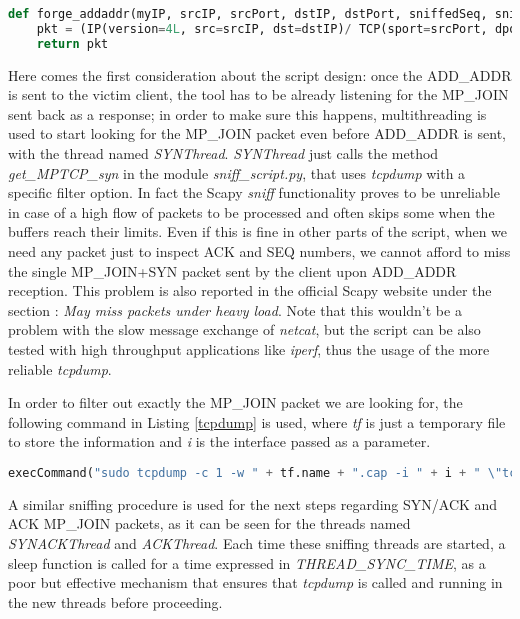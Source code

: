\begin{lstlisting}[language=python, caption=\textit{forge\_addaddr method}, label=forgeaddaddrfunction] 
def forge_addaddr(myIP, srcIP, srcPort, dstIP, dstPort, sniffedSeq, sniffedAck):
    pkt = (IP(version=4L, src=srcIP, dst=dstIP)/ TCP(sport=srcPort, dport=dstPort, flags="A", seq=sniffedSeq, ack=sniffedAck, options=[TCPOption_MP(mptcp=MPTCP_AddAddr(address_id=ADDRESS_ID, adv_addr=myIP))]))
    return pkt
\end{lstlisting}

Here comes the first consideration about the script design: once the ADD\_ADDR is sent to the victim client, the tool has to be already listening for the MP\_JOIN sent back as a response; in order to make sure this happens, multithreading is used to start looking for the MP\_JOIN packet even before ADD\_ADDR is sent, with the thread named \textit{SYNThread}. \textit{SYNThread} just calls the method \textit{get\_MPTCP\_syn} in the module \textit{sniff\_script.py}, that uses \textit{tcpdump} with a specific filter option. In fact the Scapy \textit{sniff} functionality proves to be unreliable in case of a high flow of packets to be processed and often skips some when the buffers reach their limits. Even if this is fine in other parts of the script, when we need any packet just to inspect ACK and SEQ numbers, we cannot afford to miss the single MP\_JOIN+SYN packet sent by the client upon ADD\_ADDR reception. This problem is also reported in the official Scapy website under the section : \textit{May miss packets under heavy load}.
Note that this wouldn't be a problem with the slow message exchange of \textit{netcat}, but the script can be also tested with high throughput applications like \textit{iperf}, thus the usage of the more reliable \textit{tcpdump}.

In order to filter out exactly the MP\_JOIN packet we are looking for, the following command in Listing \ref{tcpdump} is used, where \textit{tf} is just a temporary file to store the information and \textit{i} is the interface passed as a parameter.

\begin{lstlisting}[language=python, caption=\textit{tcpdump for MP\_JOIN}, label=tcpdump]
execCommand("sudo tcpdump -c 1 -w " + tf.name + ".cap -i " + i + " \"tcp[tcpflags] & tcp-syn != 0\" 2>/dev/null", shell = True)
\end{lstlisting}

A similar sniffing procedure is used for the next steps regarding SYN/ACK and ACK MP\_JOIN packets, as it can be seen for the threads named \textit{SYNACKThread} and \textit{ACKThread}. Each time these sniffing threads are started, a sleep function is called for a time expressed in \textit{THREAD\_SYNC\_TIME}, as a poor but effective mechanism that ensures that \textit{tcpdump} is called and running in the new threads before proceeding.

